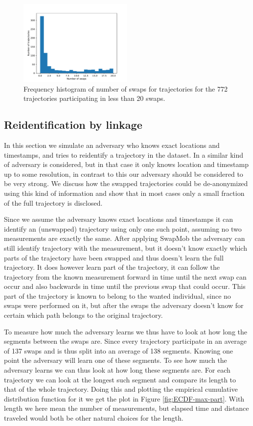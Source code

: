 \documentclass{llncs}
\begin{document}
\begin{figure}
  \center
  \includegraphics[width=0.5\textwidth]{figures/swaps-distribution.pdf}
  \caption{Frequency histogram of number of swaps for trajectories for
    the 772 trajectories participating in less than 20 swaps.}
  \label{fig:swaps-distribution}
\end{figure}

\subsection{Reidentification by linkage}
\label{sec:reidentification}
In this section we simulate an adversary who knows exact locations and
timestamps, and tries to reidentify a trajectory in the dataset. In
\cite{demontjoye2013} a similar kind of adversary is considered, but
in that case it only knows location and timestamp up to some
resolution, in contrast to this our adversary should be considered to
be very strong. We discuss how the swapped trajectories could be
de-anonymized using this kind of information and show that in most
cases only a small fraction of the full trajectory is disclosed.

Since we assume the adversary knows exact locations and timestamps it
can identify an (unswapped) trajectory using only one such point,
assuming no two measurements are exactly the same. After applying
SwapMob the adversary can still identify trajectory with the
measurement, but it doesn't know exactly which parts of the trajectory
have been swapped and thus doesn't learn the full trajectory. It does
however learn part of the trajectory, it can follow the trajectory
from the known measurement forward in time until the next swap can
occur and also backwards in time until the previous swap that could
occur. This part of the trajectory is known to belong to the wanted
individual, since no swaps were performed on it, but after the swaps
the adversary doesn't know for certain which path belongs to the
original trajectory.

To measure how much the adversary learns we thus have to look at how
long the segments between the swaps are. Since every trajectory
participate in an average of 137 swaps and is thus split into an
average of 138 segments. Knowing one point the adversary will learn
one of these segments. To see how much the adversary learns we can
thus look at how long these segments are. For each trajectory we can
look at the longest such segment and compare its length to that of the
whole trajectory. Doing this and plotting the empirical cumulative
distribution function for it we get the plot in Figure
\ref{fig:ECDF-max-part}. With length we here mean the number of
measurements, but elapsed time and distance traveled would both be
other natural choices for the length.
\end{document}
